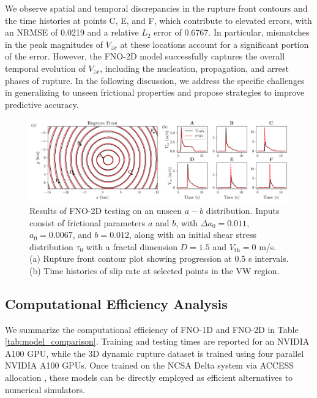 \documentclass[draft]{agujournal2019}
\begin{document}
We observe spatial and temporal discrepancies in the rupture front contours and the time histories at points C, E, and F, which contribute to elevated errors, with an NRMSE of 0.0219 and a relative \( L_2 \) error of 0.6767. In particular, mismatches in the peak magnitudes of \( V_{zx} \) at these locations account for a significant portion of the error. However, the FNO-2D model successfully captures the overall temporal evolution of \( V_{zx} \), including the nucleation, propagation, and arrest phases of rupture. In the following discussion, we address the specific challenges in generalizing to unseen frictional properties and propose strategies to improve predictive accuracy.

\begin{figure}
\centering
\includegraphics[width=1.0\linewidth]{3D_fractal_unseenab.png}
\caption{\label{fig:3D_unseen_ab}Results of FNO-2D testing on an unseen \(a-b\) distribution. Inputs consist of frictional parameters \(a\) and \(b\), with \(\Delta a_{0} = 0.011\), \(a_{0} = 0.0067\), and \(b = 0.012\), along with an initial shear stress distribution \(\tau_{0}\) with a fractal dimension \(D = 1.5\) and \(V_\text{th}=0\) m/s. (a) Rupture front contour plot showing progression at 0.5 s intervals. (b) Time histories of slip rate at selected points in the VW region.
}
\end{figure}

\subsection{Computational Efficiency Analysis}
\label{sec:comp_efficienvy}

We summarize the computational efficiency of FNO-1D and FNO-2D in Table \ref{tab:model_comparison}. Training and testing times are reported for an NVIDIA A100 GPU, while the 3D dynamic rupture dataset is trained using four parallel NVIDIA A100 GPUs. Once trained on the NCSA Delta system via ACCESS allocation \cite{boerner2023access}, these models can be directly employed as efficient alternatives to numerical simulators.
\end{document}
